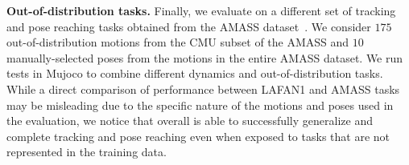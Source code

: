 \textbf{Out-of-distribution tasks.} Finally, we evaluate \method{} on a different set of tracking and pose reaching tasks obtained from the AMASS dataset~\citep{Mahmood2019AMASS}. We consider $175$ out-of-distribution motions from the CMU subset of the AMASS and $10$ manually-selected poses from the motions in the entire AMASS dataset. We run tests in Mujoco to combine different dynamics and out-of-distribution tasks. While a direct comparison of performance between LAFAN1 and AMASS tasks may be misleading due to the specific nature of the motions and poses used in the evaluation, we notice that overall \method{} is able to successfully generalize and complete tracking and pose reaching even when exposed to tasks that are not represented in the training data.



